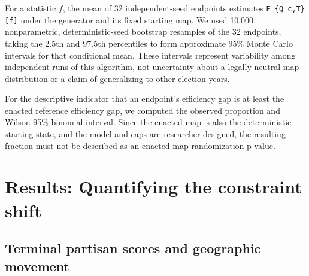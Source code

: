 \documentclass[
  10pt,
]{article}
\begin{document}
For a statistic \(f\), the mean of 32 independent-seed endpoints
estimates \texttt{E\_\{Q\_c,T\}{[}f{]}} under the generator and its
fixed starting map. We used 10,000 nonparametric, deterministic-seed
bootstrap resamples of the 32 endpoints, taking the 2.5th and 97.5th
percentiles to form approximate 95\% Monte Carlo intervals for that
conditional mean. These intervals represent variability among
independent runs of this algorithm, not uncertainty about a legally
neutral map distribution or a claim of generalizing to other election
years.

For the descriptive indicator that an endpoint's efficiency gap is at
least the enacted reference efficiency gap, we computed the observed
proportion and Wilson 95\% binomial interval. Since the enacted map is
also the deterministic starting state, and the model and caps are
researcher-designed, the resulting fraction must not be described as an
enacted-map randomization p-value.

\hypertarget{results-quantifying-the-constraint-shift}{%
\section{Results: Quantifying the constraint
shift}\label{results-quantifying-the-constraint-shift}}

\hypertarget{terminal-partisan-scores-and-geographic-movement}{%
\subsection{Terminal partisan scores and geographic
movement}\label{terminal-partisan-scores-and-geographic-movement}}
\end{document}
